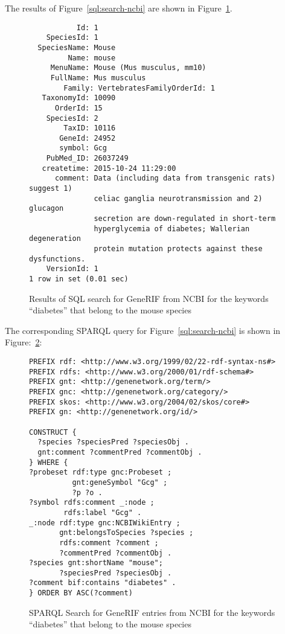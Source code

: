 The results of Figure~\ref{sql:search-ncbi} are shown in Figure~\ref{sql:ncbi-results}.

\begin{figure}[H]
\centering
\begin{verbatim}
           Id: 1
    SpeciesId: 1
  SpeciesName: Mouse
         Name: mouse
     MenuName: Mouse (Mus musculus, mm10)
     FullName: Mus musculus
        Family: VertebratesFamilyOrderId: 1
   TaxonomyId: 10090
      OrderId: 15
    SpeciesId: 2
        TaxID: 10116
       GeneId: 24952
       symbol: Gcg
    PubMed_ID: 26037249
   createtime: 2015-10-24 11:29:00
      comment: Data (including data from transgenic rats) suggest 1)
               celiac ganglia neurotransmission and 2) glucagon
               secretion are down-regulated in short-term
               hyperglycemia of diabetes; Wallerian degeneration
               protein mutation protects against these dysfunctions.
    VersionId: 1
1 row in set (0.01 sec)
\end{verbatim}
\caption{Results of SQL search for GeneRIF from NCBI for the keywords ``diabetes'' that belong to the mouse species}\label{sql:ncbi-results}
\end{figure}

The corresponding SPARQL query for Figure~\ref{sql:search-ncbi} is shown in Figure:~\ref{sparql:ncbi-rif}:

\begin{figure}[H]
\centering
\begin{verbatim}
PREFIX rdf: <http://www.w3.org/1999/02/22-rdf-syntax-ns#>
PREFIX rdfs: <http://www.w3.org/2000/01/rdf-schema#>
PREFIX gnt: <http://genenetwork.org/term/>
PREFIX gnc: <http://genenetwork.org/category/>
PREFIX skos: <http://www.w3.org/2004/02/skos/core#>
PREFIX gn: <http://genenetwork.org/id/>

CONSTRUCT {
  ?species ?speciesPred ?speciesObj .
  gnt:comment ?commentPred ?commentObj .
} WHERE {
?probeset rdf:type gnc:Probeset ;
          gnt:geneSymbol "Gcg" ;
          ?p ?o .
?symbol rdfs:comment _:node ;
        rdfs:label "Gcg" .
_:node rdf:type gnc:NCBIWikiEntry ;
       gnt:belongsToSpecies ?species ;
       rdfs:comment ?comment ;
       ?commentPred ?commentObj .
?species gnt:shortName "mouse";
       ?speciesPred ?speciesObj .
?comment bif:contains "diabetes" .
} ORDER BY ASC(?comment)
\end{verbatim}
\caption{SPARQL Search for GeneRIF entries from NCBI for the keywords ``diabetes'' that belong to the mouse species}\label{sparql:ncbi-rif}
\end{figure}

